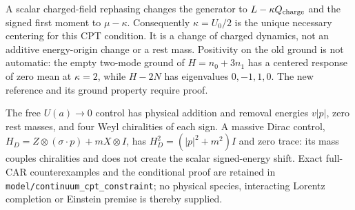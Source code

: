 A scalar charged-field rephasing changes the generator to
$L-\kappa Q_{\rm charge}$ and the signed first moment to $\mu-\kappa$.
Consequently $\kappa=U_0/2$ is the unique necessary centering for this
CPT condition. It is a change of charged dynamics, not an additive
energy-origin change or a rest mass. Positivity on the old ground is
not automatic: the empty two-mode ground of $H=n_0+3n_1$ has a centered
response of zero mean at $\kappa=2$, while $H-2N$ has eigenvalues
$0,-1,1,0$. The new reference and its ground property require proof.

The free $U(a)\to0$ control has physical addition and removal energies
$v|p|$, zero rest masses, and four Weyl chiralities of each sign. A
massive Dirac control, $H_D=Z\otimes(\sigma\cdot p)+mX\otimes I$,
has $H_D^2=(|p|^2+m^2)I$ and zero trace: its mass couples chiralities
and does not create the scalar signed-energy shift. Exact full-CAR
counterexamples and the conditional proof are retained in
\texttt{model/continuum\_cpt\_constraint}; no physical species, interacting
Lorentz completion or Einstein premise is thereby supplied.
